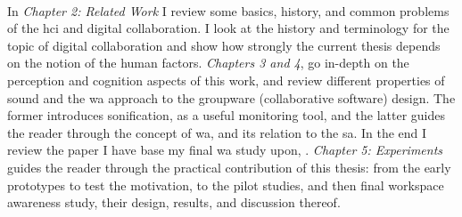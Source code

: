 \paragraph[Overview]{}
In \textit{Chapter 2: Related Work} I review some basics, history, and common problems of the \gls{hci} and digital collaboration. I look at the history and terminology for the topic of digital collaboration and show how strongly the current thesis depends on the notion of the human factors. \textit{Chapters 3 and 4}, go in-depth on the perception and cognition aspects of this work, and review different properties of sound and the \gls{wa} approach to the groupware (collaborative software) design. The former introduces sonification, as a useful monitoring tool, and the latter guides the reader through the concept of \gls{wa}, and its relation to the \gls{sa}. In the end I review the paper I have base my final \gls{wa} study upon, \cite{gutwin_chalk_2011}. \textit{Chapter 5: Experiments} guides the reader through the practical contribution of this thesis: from the early prototypes to test the motivation, to the pilot studies, and then final workspace awareness study, their design, results, and discussion thereof.

